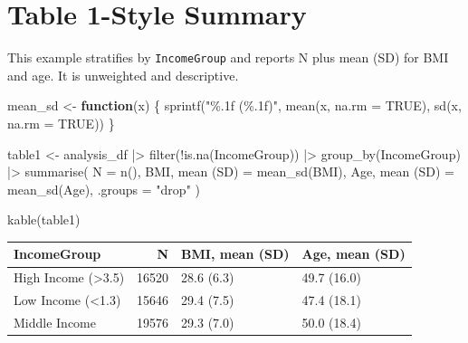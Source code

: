 \documentclass[
  letterpaper,
  DIV=11,
  numbers=noendperiod,
  oneside]{scrreprt}
\newenvironment{Shaded}{\begin{snugshade}}{\end{snugshade}}
\newcommand{\AttributeTok}[1]{\textcolor[rgb]{0.40,0.45,0.13}{#1}}
\newcommand{\ConstantTok}[1]{\textcolor[rgb]{0.56,0.35,0.01}{#1}}
\newcommand{\ControlFlowTok}[1]{\textcolor[rgb]{0.00,0.23,0.31}{\textbf{#1}}}
\newcommand{\FunctionTok}[1]{\textcolor[rgb]{0.28,0.35,0.67}{#1}}
\newcommand{\NormalTok}[1]{\textcolor[rgb]{0.00,0.23,0.31}{#1}}
\newcommand{\OtherTok}[1]{\textcolor[rgb]{0.00,0.23,0.31}{#1}}
\newcommand{\SpecialCharTok}[1]{\textcolor[rgb]{0.37,0.37,0.37}{#1}}
\newcommand{\StringTok}[1]{\textcolor[rgb]{0.13,0.47,0.30}{#1}}
\begin{document}
\section*{Table 1-Style Summary}\label{table-1-style-summary}


This example stratifies by \texttt{IncomeGroup} and reports N plus mean
(SD) for BMI and age. It is unweighted and descriptive.

\begin{Shaded}
\begin{Highlighting}[numbers=left,,]
\NormalTok{mean\_sd }\OtherTok{\textless{}{-}} \ControlFlowTok{function}\NormalTok{(x) \{}
  \FunctionTok{sprintf}\NormalTok{(}\StringTok{"\%.1f (\%.1f)"}\NormalTok{, }\FunctionTok{mean}\NormalTok{(x, }\AttributeTok{na.rm =} \ConstantTok{TRUE}\NormalTok{), }\FunctionTok{sd}\NormalTok{(x, }\AttributeTok{na.rm =} \ConstantTok{TRUE}\NormalTok{))}
\NormalTok{\}}

\NormalTok{table1 }\OtherTok{\textless{}{-}}\NormalTok{ analysis\_df }\SpecialCharTok{|\textgreater{}}
  \FunctionTok{filter}\NormalTok{(}\SpecialCharTok{!}\FunctionTok{is.na}\NormalTok{(IncomeGroup)) }\SpecialCharTok{|\textgreater{}}
  \FunctionTok{group\_by}\NormalTok{(IncomeGroup) }\SpecialCharTok{|\textgreater{}}
  \FunctionTok{summarise}\NormalTok{(}
    \AttributeTok{N =} \FunctionTok{n}\NormalTok{(),}
    \StringTok{\textasciigrave{}}\AttributeTok{BMI, mean (SD)}\StringTok{\textasciigrave{}} \OtherTok{=} \FunctionTok{mean\_sd}\NormalTok{(BMI),}
    \StringTok{\textasciigrave{}}\AttributeTok{Age, mean (SD)}\StringTok{\textasciigrave{}} \OtherTok{=} \FunctionTok{mean\_sd}\NormalTok{(Age),}
    \AttributeTok{.groups =} \StringTok{"drop"}
\NormalTok{  )}

\FunctionTok{kable}\NormalTok{(table1)}
\end{Highlighting}
\end{Shaded}

\begin{longtable}[]{@{}lrll@{}}
\toprule\noalign{}
IncomeGroup & N & BMI, mean (SD) & Age, mean (SD) \\
\midrule\noalign{}
\endhead
\bottomrule\noalign{}
\endlastfoot
High Income (\textgreater3.5) & 16520 & 28.6 (6.3) & 49.7 (16.0) \\
Low Income (\textless1.3) & 15646 & 29.4 (7.5) & 47.4 (18.1) \\
Middle Income & 19576 & 29.3 (7.0) & 50.0 (18.4) \\
\end{longtable}
\end{document}
